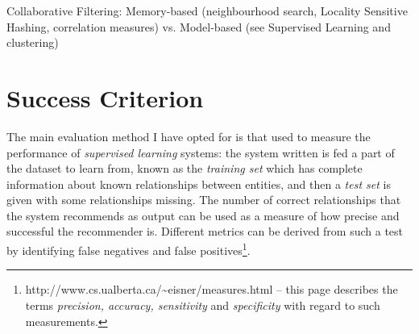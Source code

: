 Collaborative Filtering: Memory-based (neighbourhood search, Locality Sensitive Hashing, correlation measures) vs. Model-based (see Supervised Learning and clustering)



\section{Success Criterion}

The main evaluation method I have opted for is that used to measure the performance of \textit{supervised learning} systems: the system written is fed a part of the dataset to learn from, known as the \textit{training set} which has complete information about known relationships between entities, and then a \textit{test set} is given with some relationships missing. The number of correct relationships that the system recommends as output can be used as a measure of how precise and successful the recommender is. Different metrics can be derived from such a test by identifying false negatives and false positives\footnote{http://www.cs.ualberta.ca/\textasciitilde eisner/measures.html -- this page describes the terms \textit{precision, accuracy, sensitivity} and \textit{specificity} with regard to such measurements.}. 


